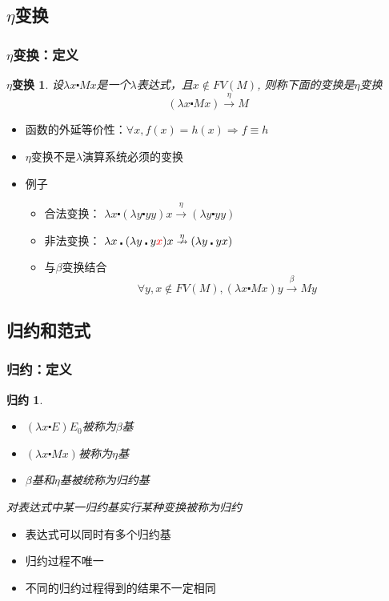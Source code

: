 \documentclass[CJKutf8,compress,hyperref]{beamer}
\begin{document}
\begin{CJK}{UTF8}{song}
\subsection{ $\eta$变换}
\begin{frame}
  \frametitle{$\eta$变换：定义} 
  \newtheorem{etaRed}{$\eta$变换} 
  \begin{etaRed}
    设$\lambda x \centerdot Mx$是一个$\lambda$表达式，且$x \not \in FV(M)$, 则称下面的变换是{\color{red}$\eta$变换}
    \begin{displaymath}
      (\lambda x \centerdot Mx) \stackrel{\eta}{\longrightarrow} M 
    \end{displaymath} 
  \end{etaRed}
  \begin{itemize}
  \item 函数的外延等价性：$\forall x, f(x) = h(x) \Longrightarrow f \equiv h$  
  \item $\eta$变换不是$\lambda$演算系统必须的变换 
  \item 例子 
    \begin{itemize}
    \item{合法变换：} $\lambda x \centerdot (\lambda y \centerdot yy) x \stackrel{\eta}{\longrightarrow}(\lambda y \centerdot yy)$ 
    \item{非法变换：}  $\lambda x \centerdot (\lambda y \centerdot y{\color{red}x}) x \stackrel{\eta}{\nrightarrow}(\lambda y \centerdot yx) $
    \item 与$\beta$变换结合
      \begin{displaymath}
        \forall y, x \not \in FV(M), (\lambda x \centerdot Mx)y \stackrel{\beta}{\longrightarrow} My
      \end{displaymath}
    \end{itemize}
  \end{itemize}
\end{frame} 

\subsection{ 归约和范式}
\begin{frame}
  \frametitle{归约：定义} 
  \newtheorem{reduction}{归约} 
  \begin{reduction} 
    \begin{itemize}
    \item $(\lambda x \centerdot E)E_0$被称为$\beta$基
    \item $(\lambda x \centerdot Mx)$被称为$\eta$基
    \item $\beta$基和$\eta$基被统称为归约基 
    \end{itemize} 
    对表达式中某一归约基实行某种变换被称为{\color{red}归约}
  \end{reduction} 
  \begin{itemize}
  \item 表达式可以同时有多个归约基 
  \item 归约过程不唯一
  \item {\color{red}不同的归约过程得到的结果不一定相同}
  \end{itemize}
\end{frame} 


\end{CJK}
\end{document}
